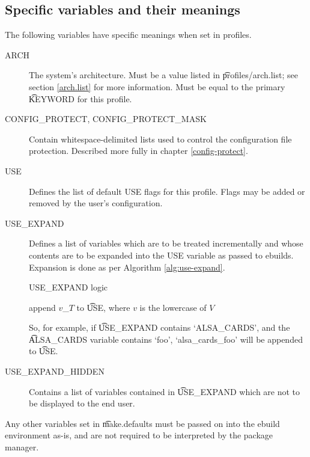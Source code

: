 \subsection{Specific variables and their meanings}
The following variables have specific meanings when set in profiles.
\begin{description}
\item[ARCH] The system's architecture. Must be a value listed in \t{profiles/arch.list}; see section
    \ref{arch.list} for more information. Must be equal to the primary \t{KEYWORD} for this profile.
\item[CONFIG\_PROTECT, CONFIG\_PROTECT\_MASK] Contain whitespace-delimited lists used to control the
    configuration file protection. Described more fully in chapter \ref{config-protect}.
\item[USE] Defines the list of default USE flags for this profile. Flags may be added or removed by
    the user's configuration.
\item[USE\_EXPAND] \label{use-expand} Defines a list of variables which are to be treated
    incrementally and whose contents are to be expanded into the USE variable as passed to ebuilds.
    Expansion is done as per Algorithm \ref{alg:use-expand}.
    \begin{algorithm}
    \caption{USE\_EXPAND logic} \label{alg:use-expand}
    \begin{algorithmic}
                \STATE append $v$\_$T$ to \t{USE}, where $v$ is the lowercase of $V$
            \ENDFOR
        \ENDFOR
    \end{algorithmic}
    \end{algorithm}
    So, for example, if \t{USE\_EXPAND} contains `ALSA\_CARDS', and the \t{ALSA\_CARDS} variable
    contains `foo', `alsa\_cards\_foo' will be appended to \t{USE}.
\item[USE\_EXPAND\_HIDDEN] Contains a list of variables contained in \t{USE\_EXPAND} which are not
    to be displayed to the end user.
\end{description}

Any other variables set in \t{make.defaults} must be passed on into the ebuild environment as-is,
and are not required to be interpreted by the package manager.

